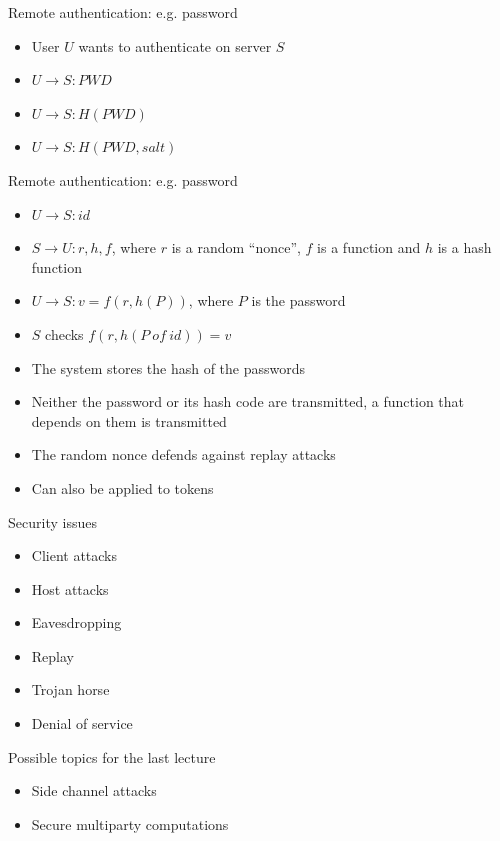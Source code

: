 \documentclass{beamer}
\begin{document}
\begin{frame}{Remote authentication: e.g. password}
  \begin{itemize}
    \item User $U$ wants to authenticate on server $S$
    \item<2-> $U \rightarrow S: PWD$
    \item<3-> $U \rightarrow S: H(PWD)$
    \item<4-> $U \rightarrow S: H(PWD,salt)$
  \end{itemize}
\end{frame}

\begin{frame}{Remote authentication: e.g. password}
  \begin{itemize}
    \item<2-> $U \rightarrow S: id$
    \item<2-> $S \rightarrow U: r, h, f$, where $r$ is a random ``nonce'', $f$ is a function and $h$ is a hash function 
    \item<2-> $U \rightarrow S: v = f(r, h(P))$, where $P$ is the password
    \item<2-> $S$ checks $f(r, h(P\ of\ id)) = v$
    \item<4-> The system stores the hash of the passwords
    \item<5-> Neither the password or its hash code are transmitted, a function that depends on them is transmitted
    \item<6-> The random nonce defends against replay attacks
    \item<2-> Can also be applied to tokens
  \end{itemize}
\end{frame}

\begin{frame}{Security issues}
  \begin{itemize}
    \item Client attacks
    \item Host attacks
    \item Eavesdropping
    \item Replay
    \item Trojan horse
    \item<2> Denial of service
  \end{itemize}
\end{frame}


\begin{frame}{Possible topics for the last lecture}
  \begin{itemize}
    \item Side channel attacks
    \item Secure multiparty computations
  \end{itemize}
\end{frame}
\end{document}
